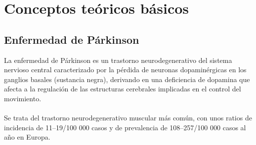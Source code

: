 
\section{Conceptos teóricos básicos}

\subsection{Enfermedad de Párkinson}
La enfermedad de Párkinson es un trastorno neurodegenerativo del sistema nervioso central caracterizado por la pérdida de neuronas dopaminérgicas en los ganglios basales (sustancia negra), derivando en una deficiencia de dopamina que afecta a la regulación de las estructuras cerebrales implicadas en el control del movimiento. \\ \\
Se trata del trastorno neurodegenerativo muscular más común, con unos ratios de incidencia de 11–19/100 000 casos y de prevalencia de 108–257/100 000 casos al año en Europa. \cite{balestrino2020parkinson}

